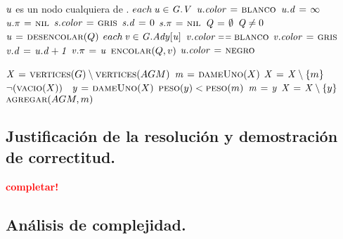 \begin{codebox}
\li \Comment $\id{u}$ es un nodo cualquiera de .
\li \For $each \hspace{0.07cm} \id{u} \in \id{G.V}$
\li     \Do
            $\id{u.color} \gets \const{blanco}$
\li         $\id{u.d} \gets \infty$
\li         $\id{u.\pi} \gets \const{nil}$
        \End
\li $\id{s.color} \gets \const{gris}$
\li $\id{s.d} \gets 0$
\li $\id{s.\pi} \gets \const{nil}$
\li $\id{Q} \gets \emptyset$
\li \While $\id{Q} \neq 0$
\li     \Do
            $\id{u} \gets \proc{desencolar}(Q)$
\li         \For $each \hspace{0.07cm} \id{v} \in \id{G.Ady[u]}$
                \Do
\li                 \If $\id{v.color} \isequal \const{blanco}$
\li                     \Then
                            $\id{v.color} \gets \const{gris}$
\li                         $\id{v.d} \gets \id{u.d + 1}$
\li                         $\id{v.\pi} \gets \id{u}$
\li                         $\textnormal{\scshape encolar}(Q,v)$
                        \End
                \End
\li     $\id{u.color} \gets \const{negro}$
        \End            
\end{codebox}


\vspace*{0.3cm}


\begin{codebox}
\li $\id{X} \gets \proc{vertices}(G) \setminus \proc{vertices}(AGM)$
\li $\id{m} \gets \proc{dameUno}(X)$
\li $\id{X} \gets \id{X} \setminus \{m\}$
\li \While $\neg (\textnormal{\scshape vacio}(X))$ 
\li     \Do
\           $\id{y} \gets \proc{dameUno}(X)$
\li         \If $\textnormal{\scshape peso}(y) < \textnormal{\scshape peso}(m)$ 
\li             \Then
                    $\id{m} \gets \id{y}$
                \End
\li         $\id{X} \gets \id{X} \setminus \{y\}$
        \End
\li \Return $\textnormal{\scshape agregar}(AGM, m)$
\end{codebox}



\newpage
\subsection{Justificación de la resolución y demostración de correctitud.}

\vspace*{0.3cm}

\textcolor{red}{\textbf{completar!}}



\newpage
\subsection{Análisis de complejidad.}

